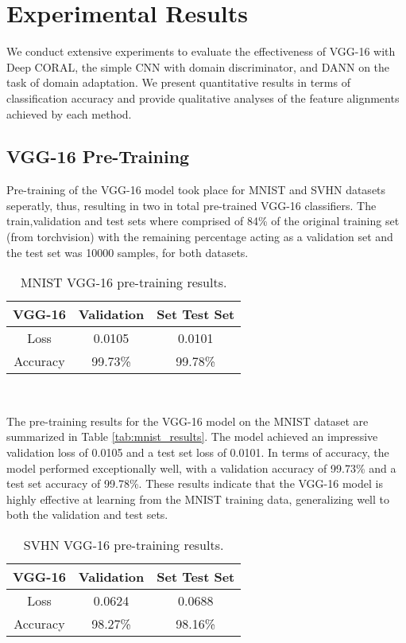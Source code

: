 \documentclass[conference]{IEEEtran}
\begin{document}
\FloatBarrier


\section{Experimental Results}
We conduct extensive experiments to evaluate the effectiveness of VGG-16 with Deep CORAL, the simple CNN with domain discriminator, and DANN on the task of domain adaptation. We present quantitative results in terms of classification accuracy and provide qualitative analyses of the feature alignments achieved by each method.

\subsection{VGG-16 Pre-Training}
Pre-training of the VGG-16 model took place for MNIST and SVHN datasets seperatly, thus, resulting in
two in total pre-trained VGG-16 classifiers. The train,validation and test sets where comprised of 
84\% of the original training set (from torchvision) with the remaining percentage acting as a validation set and the test set was 10000 samples, for both datasets.
\vspace{5pt}
\begin{table}[h!]
\centering
\begin{tabular}{||c c c||}
  \hline
    VGG-16 & Validation & Set Test Set \\ 
    \hline \hline
    Loss & 0.0105 & 0.0101 \\  
    Accuracy & 99.73\% & 99.78\% \\ 
    \hline
\end{tabular} \\ [1ex]
\caption{MNIST VGG-16 pre-training results.}
\label{table:1}
\end{table}
The pre-training results for the VGG-16 model on the MNIST dataset are summarized in Table \ref{tab:mnist_results}. The model achieved an impressive validation loss of 0.0105 and a test set loss of 0.0101. In terms of accuracy, the model performed exceptionally well, with a validation accuracy of 99.73\% and a test set accuracy of 99.78\%. These results indicate that the VGG-16 model is highly effective at learning from the MNIST training data, generalizing well to both the validation and test sets.

\begin{table}[h!]
  \centering
  \begin{tabular}{||c c c||}
  \hline
    VGG-16 & Validation & Set Test Set \\ 
    \hline \hline
    Loss & 0.0624 & 0.0688 \\  
    Accuracy & 98.27\% & 98.16\% \\
    \hline
  \end{tabular} \\ [1ex]
  \caption{SVHN VGG-16 pre-training results.}
  \label{tab:example_table}
\end{table}
\end{document}
